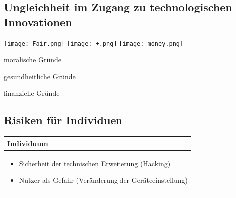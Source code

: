 \documentclass[aspectratio=169,16pt,xcolor=table]{beamer}
\begin{document}
\subsection{Ungleichheit im Zugang zu technologischen Innovationen}
\begin{frame} %
    \centering
    
    \texttt{[image: Fair.png]}
    \hspace{1.0cm}
    \texttt{[image: +.png]}
    \hspace{1.0cm}
    \texttt{[image: money.png]}
    
    \vspace{0.2cm}
    
    \begin{minipage}[t]{0.2\textwidth}
      \centering
      \small moralische Gründe
    \end{minipage}
     \hspace{1.0cm}
    \begin{minipage}[t]{0.2\textwidth}
    \centering
    \small gesundheitliche Gründe
    \end{minipage}
    \hspace{1,0cm}
    \begin{minipage}[t]{0.2\textwidth}
    \centering
    \small finanzielle Gründe
    \end{minipage}
\end{frame}


\subsection{Risiken für Individuen}
\begin{frame} %
\centering
\renewcommand{\arraystretch}{1.5} %
\begin{tabular}{|p{12cm}|}
    \hline
    \rowcolor{blue!25}
    \textbf{Individuum} \\
    \hline
    \begin{itemize}
        \item Sicherheit der technischen Erweiterung (Hacking)
        \item Nutzer als Gefahr (Veränderung der Geräteeinstellung)
    \end{itemize} \\
    \hline
\end{tabular}
\end{frame}
\end{document}
